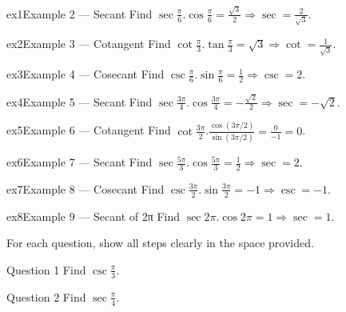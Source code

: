 \documentclass[11pt]{article}
\begin{document}
\begin{example}{ex1}{Example 2 --- Secant}
Find $\sec\tfrac{\pi}{6}$.\soln $\cos\tfrac{\pi}{6}=\tfrac{\sqrt3}{2}\Rightarrow\sec=\tfrac{2}{\sqrt3}$.
\end{example}

\begin{example}{ex2}{Example 3 --- Cotangent}
Find $\cot\tfrac{\pi}{3}$.\soln $\tan\tfrac{\pi}{3}=\sqrt3\Rightarrow\cot=\tfrac1{\sqrt3}$.
\end{example}

\begin{example}{ex3}{Example 4 --- Cosecant}
Find $\csc\tfrac{\pi}{6}$.\soln $\sin\tfrac{\pi}{6}=\tfrac12\Rightarrow\csc=2$.
\end{example}

\begin{example}{ex4}{Example 5 --- Secant}
Find $\sec\tfrac{3\pi}{4}$.\soln $\cos\tfrac{3\pi}{4}=-\tfrac{\sqrt2}{2}\Rightarrow\sec=-\sqrt2$.
\end{example}

\begin{example}{ex5}{Example 6 --- Cotangent}
Find $\cot\tfrac{3\pi}{2}$.\soln $\tfrac{\cos(3\pi/2)}{\sin(3\pi/2)}=\tfrac{0}{-1}=0$.
\end{example}

\begin{example}{ex6}{Example 7 --- Secant}
Find $\sec\tfrac{5\pi}{3}$.\soln $\cos\tfrac{5\pi}{3}=\tfrac12\Rightarrow\sec=2$.
\end{example}

\begin{example}{ex7}{Example 8 --- Cosecant}
Find $\csc\tfrac{3\pi}{2}$.\soln $\sin\tfrac{3\pi}{2}=-1\Rightarrow\csc=-1$.
\end{example}

\begin{example}{ex8}{Example 9 --- Secant of 2π}
Find $\sec 2\pi$.\soln $\cos 2\pi=1\Rightarrow\sec=1$.
\end{example}

\clearpage
{}
For each question, show all steps clearly in the space provided.

\begin{qbox}{Question 1}
Find $\csc\tfrac{\pi}{3}$.\workspace{2.4cm}
\end{qbox}

\begin{qbox}{Question 2}
Find $\sec\tfrac{\pi}{4}$.\workspace{2.4cm}
\end{qbox}
\end{document}

